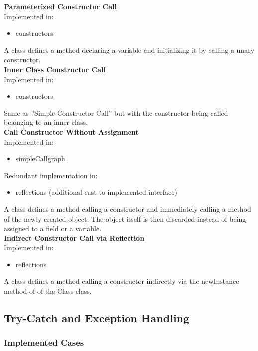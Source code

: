 \documentclass{article}
\begin{document}
\noindent
\textbf{Parameterized Constructor Call}\\
Implemented in: 
\begin{itemize}
    \item constructors
\end{itemize}
A class defines a method declaring a variable and initializing it by calling a unary constructor.\\

\noindent
\textbf{Inner Class Constructor Call}\\
Implemented in: 
\begin{itemize}
    \item constructors
\end{itemize}
Same as ''Simple Constructor Call'' but with the constructor being called belonging to an inner class.\\

\noindent
\textbf{Call Constructor Without Assignment}\\
Implemented in: 
\begin{itemize}
    \item simpleCallgraph
\end{itemize}
Redundant implementation in: 
\begin{itemize}
    \item reflections (additional cast to implemented interface)
\end{itemize}
A class defines a method calling a constructor and immediately calling a method of the newly created object. The object itself is then discarded instead of being assigned to a field or a variable.\\

\noindent
\textbf{Indirect Constructor Call via Reflection}\\
Implemented in: 
\begin{itemize}
    \item reflections
\end{itemize}
A class defines a method calling a constructor indirectly via the newInstance method of of the Class class.\\

\subsection{Try-Catch and Exception Handling}
\subsubsection{Implemented Cases}
\end{document}
